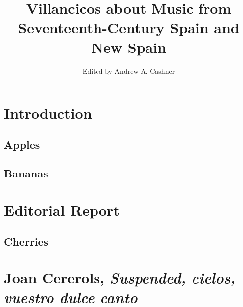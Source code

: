 \documentclass[oneside]{memoir}
\title{Villancicos about Music from Seventeenth-Century Spain and New Spain}
\author{Edited by Andrew A. Cashner}
\begin{document}
\maketitle

\tableofcontents*

\chapter{Introduction}

\lipsum

\section{Apples}

\lipsum

\section{Bananas}

\chapter{Editorial Report}

\lipsum

\section{Cherries}

\lipsum

\chapter
[Cererols, \emph{Suspended, cielos}]
{Joan Cererols, \emph{Suspended, cielos, vuestro dulce canto}}

\lipsum
\end{document}
